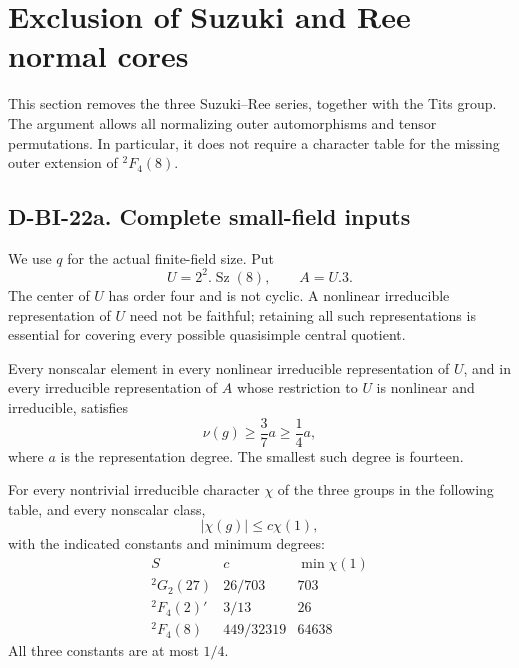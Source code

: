 \section{Exclusion of Suzuki and Ree normal cores}
\label{sec:twisted-lie-cores}

This section removes the three Suzuki--Ree series, together with
the Tits group.  The argument allows all normalizing outer
automorphisms and tensor permutations.  In particular, it does
not require a character table for the missing outer extension
of ${}^2F_4(8)$.

\subsection*{D-BI-22a. Complete small-field inputs}

We use $q$ for the actual finite-field size.  Put
\[
 U=2^2.\operatorname{Sz}(8),\qquad A=U.3.
\]
The center of $U$ has order four and is not cyclic.  A nonlinear
irreducible representation of $U$ need not be faithful; retaining
all such representations is essential for covering every possible
quasisimple central quotient.

\begin{lemma}
\label{D-BI-22a}
Every nonscalar element in every nonlinear irreducible representation
of $U$, and in every irreducible representation of $A$ whose
restriction to $U$ is nonlinear and irreducible, satisfies
\[
                         \nu(g)\ge\frac37a\ge\frac14a,
                                                               \tag{BI.85}
\]
where $a$ is the representation degree.  The smallest such degree
is fourteen.

For every nontrivial irreducible character $\chi$ of the three
groups in the following table, and every nonscalar class,
\[
                  |\chi(g)|\le c\chi(1),                  \tag{BI.86}
\]
with the indicated constants and minimum degrees:
\[
\begin{array}{c|c|r}
S&c&\min\chi(1)\\\hline
{}^2G_2(27)&26/703&703\\
{}^2F_4(2)'&3/13&26\\
{}^2F_4(8)&449/32319&64638
\end{array}                                                   \tag{BI.87}
\]
All three constants are at most $1/4$.
\end{lemma}

